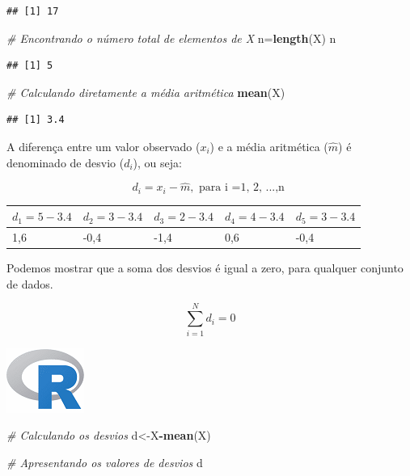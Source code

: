 \documentclass[
]{book}
\newenvironment{Shaded}{\begin{snugshade}}{\end{snugshade}}
\newcommand{\CommentTok}[1]{\textcolor[rgb]{0.56,0.35,0.01}{\textit{#1}}}
\newcommand{\KeywordTok}[1]{\textcolor[rgb]{0.13,0.29,0.53}{\textbf{#1}}}
\newcommand{\NormalTok}[1]{#1}
\newcommand{\OperatorTok}[1]{\textcolor[rgb]{0.81,0.36,0.00}{\textbf{#1}}}
\begin{document}
\begin{verbatim}
## [1] 17
\end{verbatim}

\begin{Shaded}
\begin{Highlighting}[]
\CommentTok{# Encontrando o número total de elementos de X}
\NormalTok{n=}\KeywordTok{length}\NormalTok{(X)}
\NormalTok{n}
\end{Highlighting}
\end{Shaded}

\begin{verbatim}
## [1] 5
\end{verbatim}

\begin{Shaded}
\begin{Highlighting}[]
\CommentTok{# Calculando diretamente a média aritmética}
\KeywordTok{mean}\NormalTok{(X)}
\end{Highlighting}
\end{Shaded}

\begin{verbatim}
## [1] 3.4
\end{verbatim}

A diferença entre um valor observado (\(x_i\)) e a média aritmética (\(\hat{m}\)) é denominado de desvio (\(d_i\)), ou seja:

\[
 d_i = x_i - \hat{m}, \text{ para  i =1, 2, ...,n  }
\]

\begin{longtable}[]{@{}lllll@{}}
\toprule
\(d_1 = 5-3.4\) & \(d_2=3-3.4\) & \(d_3 = 2-3.4\) & \(d_4 = 4-3.4\) & \(d_5 = 3-3.4\)\tabularnewline
\midrule
\endhead
1,6 & -0,4 & -1,4 & 0,6 & -0,4\tabularnewline
\bottomrule
\end{longtable}

Podemos mostrar que a soma dos desvios é igual a zero, para qualquer conjunto de dados.

\[
\sum_{i=1}^{N}d_i = 0
\]

\includegraphics{R.png}

\begin{Shaded}
\begin{Highlighting}[]
\CommentTok{# Calculando os desvios}
\NormalTok{d<-X}\OperatorTok{-}\KeywordTok{mean}\NormalTok{(X)}

\CommentTok{# Apresentando os valores de desvios}
\NormalTok{d}
\end{Highlighting}
\end{Shaded}
\end{document}
